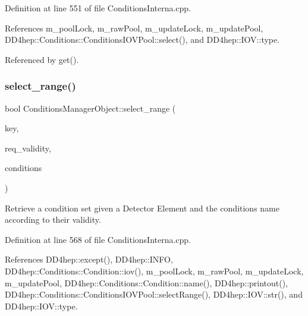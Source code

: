 Definition at line 551 of file Conditions\+Interna.\+cpp.



References m\+\_\+pool\+Lock, m\+\_\+raw\+Pool, m\+\_\+update\+Lock, m\+\_\+update\+Pool, D\+D4hep\+::\+Conditions\+::\+Conditions\+I\+O\+V\+Pool\+::select(), and D\+D4hep\+::\+I\+O\+V\+::type.



Referenced by get().

\hypertarget{class_d_d4hep_1_1_conditions_1_1_conditions_manager_object_a45b1d4f84a550788dbe24f0245ada7fb}{}\label{class_d_d4hep_1_1_conditions_1_1_conditions_manager_object_a45b1d4f84a550788dbe24f0245ada7fb} 
\subsubsection{\texorpdfstring{select\+\_\+range()}{select\_range()}}
{\footnotesize\ttfamily bool Conditions\+Manager\+Object\+::select\+\_\+range (\begin{DoxyParamCaption}\item[{\hyperlink{class_d_d4hep_1_1_conditions_1_1_condition_a7528efa762e8cc072ef80ea67c3531f9}{Condition\+::key\+\_\+type}}]{key,  }\item[{const \hyperlink{class_d_d4hep_1_1_conditions_1_1_conditions_manager_object_a0190ec510ca46da4a1cc908ac3c3a1dd}{iov\+\_\+type} \&}]{req\+\_\+validity,  }\item[{\hyperlink{namespace_d_d4hep_1_1_conditions_ae765f0140a33973a430280f02b6062f4}{Range\+Conditions} \&}]{conditions }\end{DoxyParamCaption})\hspace{0.3cm}{\ttfamily [protected]}}



Retrieve a condition set given a Detector Element and the conditions name according to their validity. 



Definition at line 568 of file Conditions\+Interna.\+cpp.



References D\+D4hep\+::except(), D\+D4hep\+::\+I\+N\+FO, D\+D4hep\+::\+Conditions\+::\+Condition\+::iov(), m\+\_\+pool\+Lock, m\+\_\+raw\+Pool, m\+\_\+update\+Lock, m\+\_\+update\+Pool, D\+D4hep\+::\+Conditions\+::\+Condition\+::name(), D\+D4hep\+::printout(), D\+D4hep\+::\+Conditions\+::\+Conditions\+I\+O\+V\+Pool\+::select\+Range(), D\+D4hep\+::\+I\+O\+V\+::str(), and D\+D4hep\+::\+I\+O\+V\+::type.



